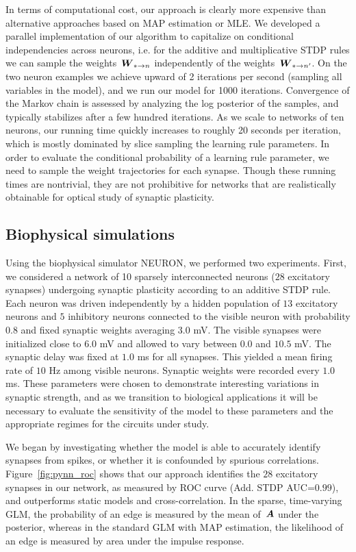In terms of computational cost, our approach is clearly more expensive
than alternative approaches based on MAP estimation or MLE. We
developed a parallel implementation of our algorithm to capitalize on
conditional independencies across neurons, i.e. for the additive and
multiplicative STDP rules we can sample the weights~${\boldsymbol{W}_{*\to n}}$
independently of the weights~${\boldsymbol{W}_{*\to n'}}$. On the two neuron
examples we achieve upward of 2 iterations per second (sampling all
variables in the model), and we run our model for 1000
iterations. Convergence of the Markov chain is assessed by analyzing
the log posterior of the samples, and typically stabilizes after a few
hundred iterations. As we scale to networks of ten neurons, our
running time quickly increases to roughly 20 seconds per iteration,
which is mostly dominated by slice sampling the learning rule
parameters. In order to evaluate the conditional probability of a
learning rule parameter, we need to sample the weight trajectories for
each synapse. Though these running times are nontrivial, they are not
prohibitive for networks that are realistically obtainable for optical
study of synaptic plasticity.

\subsection{Biophysical simulations}
Using the biophysical simulator NEURON, we performed two
experiments. First, we considered a network of 10 sparsely
interconnected neurons ($28$ excitatory synapses) undergoing synaptic
plasticity according to an additive STDP rule. Each neuron was driven
independently by a hidden population of $13$ excitatory neurons and $5$
inhibitory neurons connected to the visible neuron with probability
$0.8$ and fixed synaptic weights averaging $3.0$ mV. The visible synapses
were initialized close to $6.0$ mV and allowed to vary between $0.0$ and
$10.5$ mV. The synaptic delay was fixed at $1.0$ ms for all synapses. This
yielded a mean firing rate of $10$ Hz among visible neurons. Synaptic
weights were recorded every $1.0$ ms.  These parameters were chosen to
demonstrate interesting variations in synaptic strength, and as we
transition to biological applications it will be necessary to evaluate
the sensitivity of the model to these parameters and the appropriate
regimes for the circuits under study.

We began by investigating whether the model is able to accurately
identify synapses from spikes, or whether it is confounded by spurious
correlations.  Figure~\ref{fig:pynn_roc} shows that our approach
identifies the $28$ excitatory synapses in our network, as measured by
ROC curve (Add. STDP AUC=${0.99}$), and
outperforms static models and cross-correlation.  In the sparse,
time-varying GLM, the probability of an edge is measured by the mean
of~$\boldsymbol{A}$ under the posterior, whereas in the standard GLM with MAP
estimation, the likelihood of an edge is measured by area under the
impulse response.

